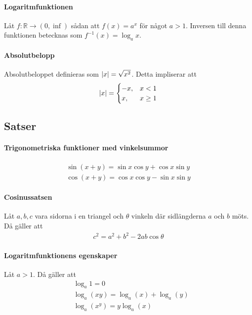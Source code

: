 \paragraph{Logaritmfunktionen}

Låt $f:\mathbb{R}\to (0,\inf)$ sådan att $f(x) = a^x$ för något $a > 1$. Inversen till denna funktionen betecknas som $f^{-1}(x) = \log_a x$.

\paragraph{Absolutbelopp}

Absolutbeloppet definieras som $\abs{x} = \sqrt{x^2}$. Detta impliserar att
\begin{align*}
	\abs{x} =
	\begin{cases}
		-x, & x < 1\\
		x,  & x \geq 1
	\end{cases}
\end{align*}
 
\subsection{Satser}

\paragraph{Trigonometriska funktioner med vinkelsummor}
\begin{align*}
	\sin\left(x+y\right) = \sin x\cos y + \cos x\sin y\\
	\cos\left(x+y\right) = \cos x\cos y - \sin x\sin y
\end{align*}

\paragraph{Cosinussatsen}

Låt $a,b,c$ vara sidorna i en triangel och $\theta$ vinkeln där sidlängderna $a$ och $b$ möts. Då gäller att
\begin{align*}
	c^2=a^2+b^2-2ab\cos\theta
\end{align*}

\paragraph{Logaritmfunktionens egenskaper}

Låt $a > 1$. Då gäller att
\begin{align}
	&\log_a 1 = 0 \label{eq:log_1}\\
	&\log_a\left(xy\right) = \log_a\left(x\right) + \log_a\left(y\right) \label{eq:log_prod}\\
	&\log_a\left(x^y\right) = y\log_a\left(x\right) \label{eq:log_pow}
\end{align}

